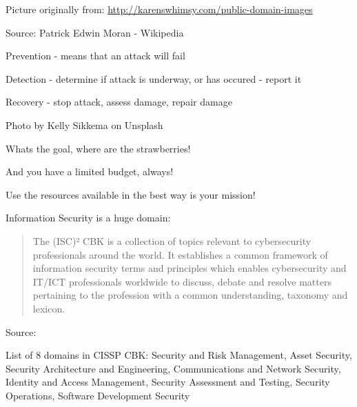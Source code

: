 \documentclass[Screen16to9,17pt]{foils}
\begin{document}

\centerline{Picture originally from: \url{http://karenswhimsy.com/public-domain-images}}





{\footnotesize Source: Patrick Edwin Moran - Wikipedia }

\begin{list2}
\item Prevention - means that an attack will fail
\item Detection - determine if attack is underway, or has occured - report it
\item Recovery - stop attack, assess damage, repair damage
\end{list2}



\hfill {\footnotesize Photo by Kelly Sikkema on Unsplash}

\centerline{Whats the goal, where are the strawberries!}

\begin{list2}
\item And you have a limited budget, always!
\item Use the resources available in the best way is your mission!
\end{list2}


Information Security is a huge domain:

\begin{quote}
The (ISC)² CBK is a collection of topics relevant to cybersecurity professionals around the world. It establishes a common framework of information security terms and principles which enables cybersecurity and IT/ICT professionals worldwide to discuss, debate and resolve matters pertaining to the profession with a common understanding, taxonomy and lexicon.
\end{quote}
Source: 

List of 8 domains in CISSP CBK: Security and Risk Management, Asset Security,
Security Architecture and Engineering, Communications and Network Security, Identity and Access Management, Security Assessment and Testing, Security Operations, Software Development Security
\end{document}
